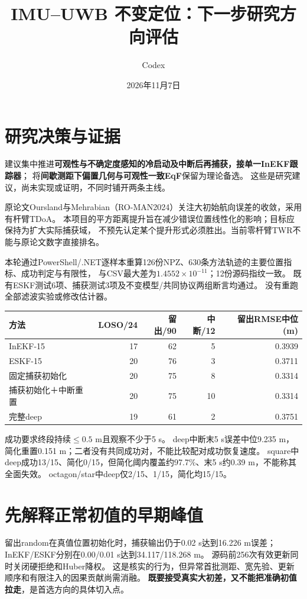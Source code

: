 \documentclass[11pt,a4paper]{ctexart}
\title{IMU--UWB 不变定位：下一步研究方向评估}
\author{Codex}
\date{2026年11月7日}
\begin{document}
\maketitle
\section{研究决策与证据}
建议集中推进\textbf{可观性与不确定度感知的冷启动及中断后再捕获，接单一InEKF跟踪器}；
将\textbf{间歇测距下偏置几何与可观性一致EqF}保留为理论备选。
这些是研究建议，尚未实现或证明，不同时铺开两条主线。

原论文Oursland与Mehrabian（RO-MAN2024）关注大初始航向误差的收敛，采用有杆臂TDoA。
本项目的平方距离提升旨在减少错误位置线性化的影响；目标应保持为扩大实际捕获域，
不预先认定某个提升形式必须胜出。当前零杆臂TWR不能与原论文数字直接排名。

本轮通过PowerShell/.NET逐样本重算126份NPZ、630条方法轨迹的主要位置指标、成功判定与有限性，
与CSV最大差为$1.4552\times10^{-11}$；12份源码指纹一致。
既有ESKF测试6项、捕获测试3项及不变模型/共同协议两组断言均通过。
没有重跑全部滤波实验或修改估计器。

\begin{center}\small
\begin{tabular}{lrrrr}
\toprule
方法&LOSO/24&留出/90&中断/12&留出RMSE中位(m)\\\midrule
InEKF-15&17&62&5&0.3939\\
ESKF-15&20&76&3&0.3711\\
固定捕获初始化&20&75&8&0.3314\\
捕获初始化＋中断重置&20&75&10&0.3314\\
完整deep&19&61&2&0.3751\\\bottomrule
\end{tabular}\end{center}
成功要求终段持续$\le0.5$ m且观察不少于5 s。
deep中断末5 s误差中位9.235 m，简化重置0.151 m；二者没有共同成功对，不能比较配对成功恢复速度。
square中deep成功13/15、简化0/15，但简化阈内覆盖约97.7\%、末5 s约0.39 m，不能称其全面失效。
octagon/star中deep仅2/15、1/15，简化均15/15。

\section{先解释正常初值的早期峰值}
留出random在真值位置初始化时，捕获输出仍于0.02 s达到16.226 m误差；
InEKF/ESKF分别在0.00/0.01 s达到34.117/118.268 m。
源码前256次有效更新同时关闭硬拒绝和Huber降权。
这是核实的行为，但异常首批测距、宽先验、更新顺序和有限注入的因果贡献尚需消融。
\textbf{既要接受真实大初差，又不能把准确初值拉走}，是首选方向的具体切入点。
\end{document}
